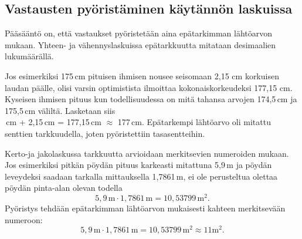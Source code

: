 \subsection*{Vastausten pyöristäminen käytännön laskuissa}

Pääsääntö on, että vastaukset pyöristetään aina epätarkimman
lähtöarvon mukaan. Yhteen- ja vähennyslaskuissa epätarkkuutta
mitataan desimaalien lukumäärällä.

Jos esimerkiksi 175\,cm pituisen ihmisen
nousee seisomaan 2,15 cm korkuisen laudan päälle, olisi varsin
optimistista ilmoittaa kokonaiskorkeudeksi 177,15 cm. Kyseisen ihmisen pituus kun todellisuudessa on mitä tahansa arvojen
174,5\,cm ja 175,5\,cm väliltä. Lasketaan siis\\
\,cm + 2,15\,cm = 177,15\,cm $\approx$ 177\,cm.
Epätarkempi lähtöarvo oli mitattu senttien tarkkuudella, joten pyöristettiin tasasentteihin.

Kerto-ja jakolaskussa tarkkuutta arvioidaan merkitsevien numeroiden mukaan. Jos esimerkiksi pitkän pöydän pituus karkeasti
mitattuna 5,9\,m ja pöydän leveydeksi saadaan tarkalla mittauksella
1,7861\,m, ei ole perusteltua olettaa pöydän pinta-alan olevan todella
\[ 5,9\,\textrm{m} \cdot 1,7861\,\textrm{m} = 10,53799\,\textrm{m}^2. \]
Pyöristys tehdään epätarkimman
lähtöarvon mukaisesti kahteen merkitsevään numeroon:
\[ 5,9\,\textrm{m} \cdot 1,7861\,\textrm{m} = 10,53799\,\textrm{m}^2 \approx 11 \textrm{m}^2.\]

